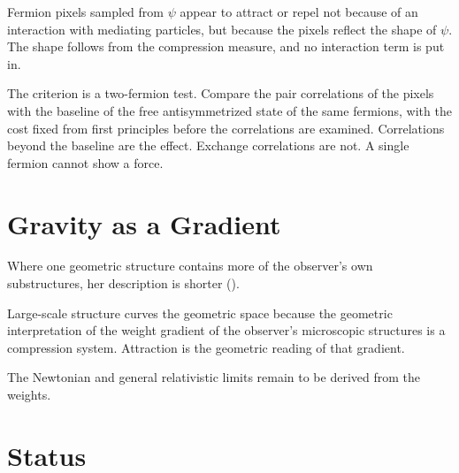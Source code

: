 \documentclass[11pt]{book}
\begin{document}
\begin{conjecture}\label{conj:forces}
  Fermion pixels sampled from $\psi$ appear to attract or repel not
  because of an interaction with mediating particles, but because the
  pixels reflect the shape of $\psi$. The shape follows from the
  compression measure, and no interaction term is put in.
\end{conjecture}

The criterion is a two-fermion test. Compare the pair correlations of the
pixels with the baseline of the free antisymmetrized state of the same
fermions, with the cost fixed from first principles before the
correlations are examined. Correlations beyond the baseline are the
effect. Exchange correlations are not. A single fermion cannot show a
force.


\section{Gravity as a Gradient}
\label{sec:gravity}

Where one geometric structure contains more of the observer's own
substructures, her description is shorter ().

\begin{conjecture}\label{conj:gravity}
  Large-scale structure curves the geometric space because the geometric
  interpretation of the weight gradient of the observer's microscopic
  structures is a compression system. Attraction is the geometric reading
  of that gradient.
\end{conjecture}

The Newtonian and general relativistic limits remain to be derived from the
weights.


\section{Status}
\label{sec:status}
\end{document}
